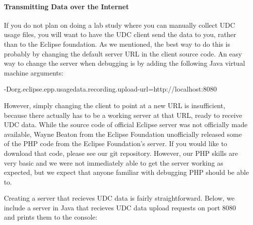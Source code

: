 \paragraph{Transmitting Data over the Internet}

If you do not plan on doing a lab study where you can manually collect UDC usage
files, you will want to have the UDC client send the data to you,
rather than to the Eclipse foundation.
As we mentioned, the best way to do this is probably by changing the default
server URL in the client source code.
An easy way to change the server when debugging is by adding the following Java
virtual machine arguments:

\noindent-Dorg.eclipse.epp.usagedata.recording.upload-url=http://localhost:8080

However, simply changing the client to point at a new URL is insufficient, 
because there actually has to be a working server at that URL, ready to 
receive UDC data.
While the source code of official Eclipse server was not officially made 
available, Wayne Beaton from the Eclipse Foundation unofficially released
some of the PHP code from the Eclipse Foundation's server.
If you would like to download that code, please see our git repository.
However, our PHP skills are very basic and we were not immediately able
to get the server working as expected, but we expect that anyone familiar with
debugging PHP should be able to.

Creating a server that recieves UDC data is fairly straightforward.
Below, we include a server in Java that recieves UDC data upload requests
on port 8080 and prints them to the console:

